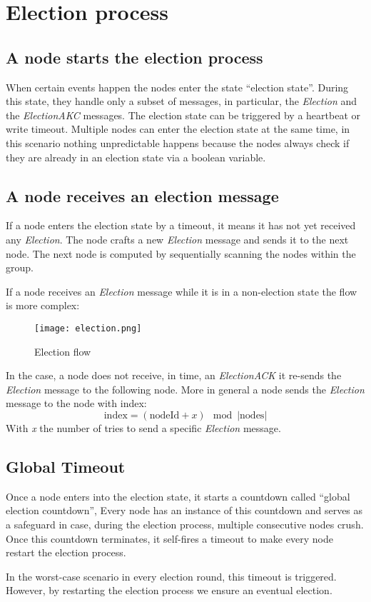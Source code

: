 \section{Election process}

\subsection{A node starts the election process}

When certain events happen the nodes enter the state ``election state''. During this state, they handle only a subset of messages, in particular, the \textit{Election} and the \textit{ElectionAKC} messages. The election state can be triggered by a heartbeat or write timeout. Multiple nodes can enter the election state at the same time, in this scenario nothing unpredictable happens because the nodes always check if they are already in an election state via a boolean variable.

\subsection{A node receives an election message}

If a node enters the election state by a timeout, it means it has not yet received any \textit{Election}. The node crafts a new \textit{Election} message and sends it to the next node. The next node is computed by sequentially scanning the nodes within the group.

If a node receives an \textit{Election} message while it is in a non-election state the flow is more complex:

\begin{figure}[h]
    \centering
    \texttt{[image: election.png]}
    \caption{Election flow}
    \label{fig:election}
\end{figure}

In the case, a node does not receive, in time, an \textit{ElectionACK} it re-sends the \textit{Election} message to the following node. More in general a node sends the \textit{Election} message to the node with index:
\begin{equation*}
    \text{index} = (\text{nodeId} + x) \mod |\text{nodes}|
\end{equation*}
With \textit{x} the number of tries to send a specific \textit{Election} message.

\subsection{Global Timeout}

Once a node enters into the election state, it starts a countdown called ``global election countdown'', Every node has an instance of this countdown and serves as a safeguard in case, during the election process, multiple consecutive nodes crush. Once this countdown terminates, it self-fires a timeout to make every node restart the election process.

In the worst-case scenario in every election round, this timeout is triggered. However, by restarting the election process we ensure an eventual election.